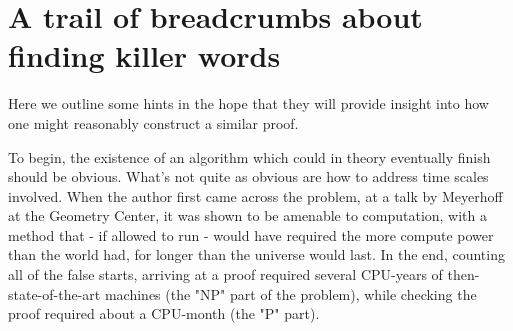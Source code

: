 \section{A trail of breadcrumbs about finding killer words}

Here we outline some hints in the hope that they will provide insight into
how one might reasonably construct a similar proof.

To begin, the existence of an algorithm which could in theory eventually finish should be obvious.
What's not quite as obvious are how to address time scales involved.
When the author first came across the problem, at a talk by Meyerhoff at the Geometry Center,
it was shown to be amenable to computation, with a method that - if allowed to run - would have
required the more compute power than the world had, for longer than the universe would last.
In the end, counting all of the false starts,
arriving at a proof required several CPU-years of then-state-of-the-art machines
(the "NP" part of the problem), while checking the proof required about a CPU-month (the "P" part).

